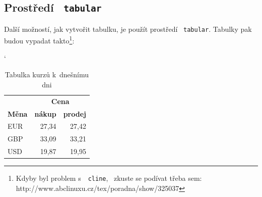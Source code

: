 \documentclass[11pt,a4paper]{article}
\begin{document}
	\subsection{Prostředí \, \texttt{tabular}}
	Další možností, jak vytvořit tabulku, je použít prostředí \, \texttt{tabular}. Tabulky pak
	budou vypadat takto\footnote[1]{Kdyby byl problem s~\, \texttt{cline}, \, zkuste se podívat třeba sem:
	http://www.abclinuxu.cz/tex/poradna/show/325037}:

	\medskip
	
	\begin{table}[h]
		\begin{center}
			\catcode`
			\begin{tabular}{|l|r|r|}
				\hline
				& \multicolumn{2}{|c|}{\textbf{Cena}} 										\\	\cline{2-3}
				\textbf{Měna}	& \textbf{nákup} 						& \textbf{prodej}	\\	\hline
				EUR 			& 27,34 								& 27,42				\\
				GBP				& 33,09									& 33,21				\\
				USD				& 19,87									& 19,95				\\	\hline
			\end{tabular}
			\caption{Tabulka kurzů k~dnešnímu dni}
			\label{tab:Cena}
		\end{center}
	\end{table}
	
\end{document}
